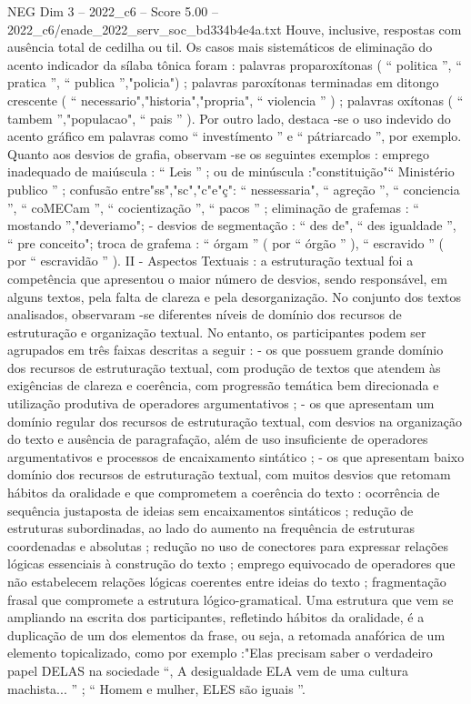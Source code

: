 \begin{textsample}{NEG Dim 3 – 2022\_c6 – Score 5.00 – 2022\_c6/enade\_2022\_serv\_soc\_bd334b4e4a.txt}
Houve, inclusive, respostas com ausência total de cedilha ou til.
Os casos mais sistemáticos de eliminação do acento indicador da sílaba tônica foram : palavras proparoxítonas ( “ politica ”, “ pratica ”, “ publica ”,"policia") ; palavras paroxítonas terminadas em ditongo crescente ( “ necessario","historia","propria", “ violencia ” ) ; palavras oxítonas ( “ tambem ”,"populacao", “ pais ” ).
Por outro lado, destaca -se o uso indevido do acento gráfico em palavras como “ investímento ” e “ pátriarcado ”, por exemplo.
Quanto aos desvios de grafia, observam -se os seguintes exemplos : emprego inadequado de maiúscula : “ Leis ” ; ou de minúscula :"constituição"“ Ministério publico ” ; confusão entre"ss","sc","c"e"ç": “ nessessaria", “ agreção ”, “ conciencia ”, “ coMECam ”, “ cocientização ”, “ pacos ” ; eliminação de grafemas : “ mostando ”,"deveriamo"; - desvios de segmentação : “ des de", “ des igualdade ”, “ pre conceito"; troca de grafema : “ órgam ” ( por “ órgão ” ), “ escravido ” ( por “ escravidão ” ).
II - Aspectos Textuais : a estruturação textual foi a competência que apresentou o maior número de desvios, sendo responsável, em alguns textos, pela falta de clareza e pela desorganização.
No conjunto dos textos analisados, observaram -se diferentes níveis de domínio dos recursos de estruturação e organização textual.
No entanto, os participantes podem ser agrupados em três faixas descritas a seguir : - os que possuem grande domínio dos recursos de estruturação textual, com produção de textos que atendem às exigências de clareza e coerência, com progressão temática bem direcionada e utilização produtiva de operadores argumentativos ; - os que apresentam um domínio regular dos recursos de estruturação textual, com desvios na organização do texto e ausência de paragrafação, além de uso insuficiente de operadores argumentativos e processos de encaixamento sintático ; - os que apresentam baixo domínio dos recursos de estruturação textual, com muitos desvios que retomam hábitos da oralidade e que comprometem a coerência do texto : ocorrência de sequência justaposta de ideias sem encaixamentos sintáticos ; redução de estruturas subordinadas, ao lado do aumento na frequência de estruturas coordenadas e absolutas ; redução no uso de conectores para expressar relações lógicas essenciais à construção do texto ; emprego equivocado de operadores que não estabelecem relações lógicas coerentes entre ideias do texto ; fragmentação frasal que compromete a estrutura lógico-gramatical.
Uma estrutura que vem se ampliando na escrita dos participantes, refletindo hábitos da oralidade, é a duplicação de um dos elementos da frase, ou seja, a retomada anafórica de um elemento topicalizado, como por exemplo :"Elas precisam saber o verdadeiro papel DELAS na sociedade “, A desigualdade ELA vem de uma cultura machista... ” ; “ Homem e mulher, ELES são iguais ”.

\end{textsample}
